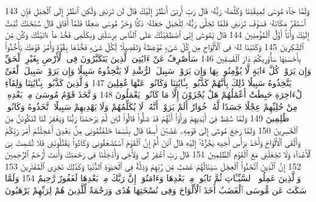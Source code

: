 {\tiny\colorbox{cl_aya}{143}} وَلَمَّا جَآءَ مُوسَىٰ لِمِيقَٰتِنَا وَكَلَّمَهُۥ رَبُّهُۥ قَالَ رَبِّ أَرِنِىٓ أَنظُرْ إِلَيْكَ قَالَ لَن تَرَىٰنِى وَلَٰكِنِ ٱنظُرْ إِلَى ٱلْجَبَلِ فَإِنِ ٱسْتَقَرَّ مَكَانَهُۥ فَسَوْفَ تَرَىٰنِى فَلَمَّا تَجَلَّىٰ رَبُّهُۥ لِلْجَبَلِ جَعَلَهُۥ دَكًّا وَخَرَّ مُوسَىٰ صَعِقًا فَلَمَّآ أَفَاقَ قَالَ سُبْحَٰنَكَ تُبْتُ إِلَيْكَ وَأَنَا۠ أَوَّلُ ٱلْمُؤْمِنِينَ
{\tiny\colorbox{cl_aya}{144}} قَالَ يَٰمُوسَىٰٓ إِنِّى ٱصْطَفَيْتُكَ عَلَى ٱلنَّاسِ بِرِسَٰلَٰتِى وَبِكَلَٰمِى فَخُذْ مَآ ءَاتَيْتُكَ وَكُن مِّنَ ٱلشَّٰكِرِينَ
{\tiny\colorbox{cl_aya}{145}} وَكَتَبْنَا لَهُۥ فِى ٱلْأَلْوَاحِ مِن كُلِّ شَىْءٍ مَّوْعِظَةً وَتَفْصِيلًا لِّكُلِّ شَىْءٍ فَخُذْهَا بِقُوَّةٍ وَأْمُرْ قَوْمَكَ يَأْخُذُوا۟ بِأَحْسَنِهَا سَأُو۟رِيكُمْ دَارَ ٱلْفَٰسِقِينَ
{\tiny\colorbox{cl_aya}{146}} سَأَصْرِفُ عَنْ ءَايَٰتِىَ ٱلَّذِينَ يَتَكَبَّرُونَ فِى ٱلْأَرْضِ بِغَيْرِ ٱلْحَقِّ وَإِن يَرَوْا۟ كُلَّ ءَايَةٍ لَّا يُؤْمِنُوا۟ بِهَا وَإِن يَرَوْا۟ سَبِيلَ ٱلرُّشْدِ لَا يَتَّخِذُوهُ سَبِيلًا وَإِن يَرَوْا۟ سَبِيلَ ٱلْغَىِّ يَتَّخِذُوهُ سَبِيلًا ذَٰلِكَ بِأَنَّهُمْ كَذَّبُوا۟ بِـَٔايَٰتِنَا وَكَانُوا۟ عَنْهَا غَٰفِلِينَ
{\tiny\colorbox{cl_aya}{147}} وَٱلَّذِينَ كَذَّبُوا۟ بِـَٔايَٰتِنَا وَلِقَآءِ ٱلْءَاخِرَةِ حَبِطَتْ أَعْمَٰلُهُمْ هَلْ يُجْزَوْنَ إِلَّا مَا كَانُوا۟ يَعْمَلُونَ
{\tiny\colorbox{cl_aya}{148}} وَٱتَّخَذَ قَوْمُ مُوسَىٰ مِنۢ بَعْدِهِۦ مِنْ حُلِيِّهِمْ عِجْلًا جَسَدًا لَّهُۥ خُوَارٌ أَلَمْ يَرَوْا۟ أَنَّهُۥ لَا يُكَلِّمُهُمْ وَلَا يَهْدِيهِمْ سَبِيلًا ٱتَّخَذُوهُ وَكَانُوا۟ ظَٰلِمِينَ
{\tiny\colorbox{cl_aya}{149}} وَلَمَّا سُقِطَ فِىٓ أَيْدِيهِمْ وَرَأَوْا۟ أَنَّهُمْ قَدْ ضَلُّوا۟ قَالُوا۟ لَئِن لَّمْ يَرْحَمْنَا رَبُّنَا وَيَغْفِرْ لَنَا لَنَكُونَنَّ مِنَ ٱلْخَٰسِرِينَ
{\tiny\colorbox{cl_aya}{150}} وَلَمَّا رَجَعَ مُوسَىٰٓ إِلَىٰ قَوْمِهِۦ غَضْبَٰنَ أَسِفًا قَالَ بِئْسَمَا خَلَفْتُمُونِى مِنۢ بَعْدِىٓ أَعَجِلْتُمْ أَمْرَ رَبِّكُمْ وَأَلْقَى ٱلْأَلْوَاحَ وَأَخَذَ بِرَأْسِ أَخِيهِ يَجُرُّهُۥٓ إِلَيْهِ قَالَ ٱبْنَ أُمَّ إِنَّ ٱلْقَوْمَ ٱسْتَضْعَفُونِى وَكَادُوا۟ يَقْتُلُونَنِى فَلَا تُشْمِتْ بِىَ ٱلْأَعْدَآءَ وَلَا تَجْعَلْنِى مَعَ ٱلْقَوْمِ ٱلظَّٰلِمِينَ
{\tiny\colorbox{cl_aya}{151}} قَالَ رَبِّ ٱغْفِرْ لِى وَلِأَخِى وَأَدْخِلْنَا فِى رَحْمَتِكَ وَأَنتَ أَرْحَمُ ٱلرَّٰحِمِينَ
{\tiny\colorbox{cl_aya}{152}} إِنَّ ٱلَّذِينَ ٱتَّخَذُوا۟ ٱلْعِجْلَ سَيَنَالُهُمْ غَضَبٌ مِّن رَّبِّهِمْ وَذِلَّةٌ فِى ٱلْحَيَوٰةِ ٱلدُّنْيَا وَكَذَٰلِكَ نَجْزِى ٱلْمُفْتَرِينَ
{\tiny\colorbox{cl_aya}{153}} وَٱلَّذِينَ عَمِلُوا۟ ٱلسَّيِّـَٔاتِ ثُمَّ تَابُوا۟ مِنۢ بَعْدِهَا وَءَامَنُوٓا۟ إِنَّ رَبَّكَ مِنۢ بَعْدِهَا لَغَفُورٌ رَّحِيمٌ
{\tiny\colorbox{cl_aya}{154}} وَلَمَّا سَكَتَ عَن مُّوسَى ٱلْغَضَبُ أَخَذَ ٱلْأَلْوَاحَ وَفِى نُسْخَتِهَا هُدًى وَرَحْمَةٌ لِّلَّذِينَ هُمْ لِرَبِّهِمْ يَرْهَبُونَ
